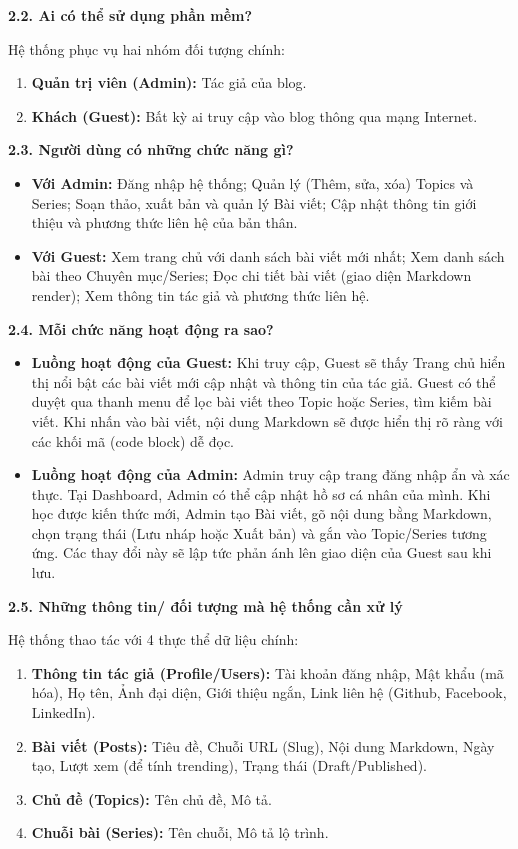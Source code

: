 \documentclass[a4paper,12pt]{article}
\begin{document}
\textbf{2.2. Ai có thể sử dụng phần mềm?}

Hệ thống phục vụ hai nhóm đối tượng chính:
\begin{enumerate}
    \item \textbf{Quản trị viên (Admin):} Tác giả của blog.
    \item \textbf{Khách (Guest):} Bất kỳ ai truy cập vào blog thông qua mạng Internet.
\end{enumerate}

\textbf{2.3. Người dùng có những chức năng gì?}
\begin{itemize}
    \item \textbf{Với Admin:} Đăng nhập hệ thống; Quản lý (Thêm, sửa, xóa) Topics và Series; Soạn thảo, xuất bản và quản lý Bài viết; Cập nhật thông tin giới thiệu và phương thức liên hệ của bản thân.
    \item \textbf{Với Guest:} Xem trang chủ với danh sách bài viết mới nhất; Xem danh sách bài theo Chuyên mục/Series; Đọc chi tiết bài viết (giao diện Markdown render); Xem thông tin tác giả và phương thức liên hệ.
\end{itemize}

\textbf{2.4. Mỗi chức năng hoạt động ra sao?}
\begin{itemize}
    \item \textbf{Luồng hoạt động của Guest:} Khi truy cập, Guest sẽ thấy Trang chủ hiển thị nổi bật các bài viết mới cập nhật và thông tin của tác giả. Guest có thể duyệt qua thanh menu để lọc bài viết theo Topic hoặc Series, tìm kiếm bài viết. Khi nhấn vào bài viết, nội dung Markdown sẽ được hiển thị rõ ràng với các khối mã (code block) dễ đọc.
    \item \textbf{Luồng hoạt động của Admin:} Admin truy cập trang đăng nhập ẩn và xác thực. Tại Dashboard, Admin có thể cập nhật hồ sơ cá nhân của mình. Khi học được kiến thức mới, Admin tạo Bài viết, gõ nội dung bằng Markdown, chọn trạng thái (Lưu nháp hoặc Xuất bản) và gắn vào Topic/Series tương ứng. Các thay đổi này sẽ lập tức phản ánh lên giao diện của Guest sau khi lưu.
\end{itemize}

\textbf{2.5. Những thông tin/ đối tượng mà hệ thống cần xử lý}

Hệ thống thao tác với 4 thực thể dữ liệu chính:
\begin{enumerate}
    \item \textbf{Thông tin tác giả (Profile/Users):} Tài khoản đăng nhập, Mật khẩu (mã hóa), Họ tên, Ảnh đại diện, Giới thiệu ngắn, Link liên hệ (Github, Facebook, LinkedIn).
    \item \textbf{Bài viết (Posts):} Tiêu đề, Chuỗi URL (Slug), Nội dung Markdown, Ngày tạo, Lượt xem (để tính trending), Trạng thái (Draft/Published).
    \item \textbf{Chủ đề (Topics):} Tên chủ đề, Mô tả.
    \item \textbf{Chuỗi bài (Series):} Tên chuỗi, Mô tả lộ trình.
\end{enumerate}
\end{document}
